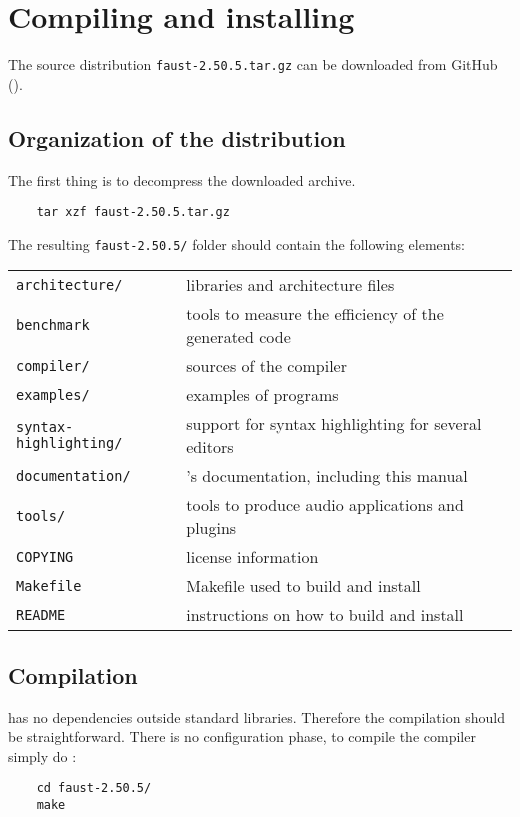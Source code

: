 \chapter{Compiling and installing \faust}
\label{install}


The \faust source distribution \lstinline'faust-2.50.5.tar.gz' can be downloaded from GitHub ().

\section{Organization of the distribution}
The first thing is to decompress the downloaded archive. 
\begin{lstlisting}
	tar xzf faust-2.50.5.tar.gz
\end{lstlisting}

The resulting \lstinline'faust-2.50.5/' folder should contain the following elements:

\begin{tabular}{ll}
	\lstinline'architecture/' 		&\faust libraries and architecture files\\
	\lstinline'benchmark'			&tools to measure the efficiency of the generated code\\
	\lstinline'compiler/'			&sources of the \faust compiler\\
	\lstinline'examples/'			&examples of \faust programs\\
	\lstinline'syntax-highlighting/'&	support for syntax highlighting for several editors\\
	\lstinline'documentation/' 		&\faust's documentation, including this manual\\
	\lstinline'tools/'				&tools to produce audio applications and plugins\\
	\lstinline'COPYING'			&license information\\
	\lstinline'Makefile'			&Makefile used to build and install \faust\\
	\lstinline'README'			&instructions on how to build and install \faust
\end{tabular}

\section{Compilation}
\faust has no dependencies outside standard libraries. Therefore the compilation should be straightforward. There is no configuration phase, to compile the \faust compiler simply do :
\begin{lstlisting}
	cd faust-2.50.5/
	make
\end{lstlisting}

